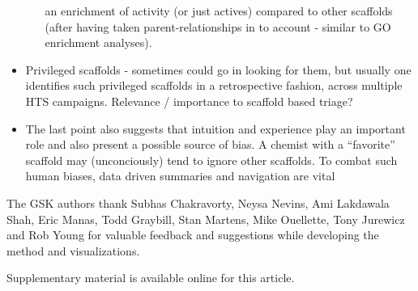 \documentclass[journal=jacsat,manuscript=article]{achemso}
\begin{document}
\begin{itemize}
\begin{itemize}
    an enrichment of activity (or just actives) compared to other
    scaffolds (after having taken parent-relationships in to account -
    similar to GO enrichment analyses).
  \end{itemize}
\item Privileged scaffolds - sometimes could go in looking for them,
  but usually one identifies such privileged scaffolds in a
  retrospective fashion, across multiple HTS campaigns. Relevance /
  importance to scaffold based triage?
\item The last point also suggests that intuition and experience play
  an important role and also present a possible source of bias. A
  chemist with a ``favorite'' scaffold may (unconciously) tend to
  ignore other scaffolds. To combat such human biases, data driven
  summaries and navigation are vital
\end{itemize}

\begin{acknowledgement}
  The GSK authors thank Subhas Chakravorty, Neysa Nevins, Ami Lakdawala Shah,
  Eric Manas, Todd Graybill, Stan Martens, Mike Ouellette, Tony Jurewicz and Rob
  Young for valuable feedback and suggestions while developing the method and
  visualizations.
\end{acknowledgement}

\begin{suppinfo}
Supplementary material is available online for this article.
\end{suppinfo}


\end{document}
